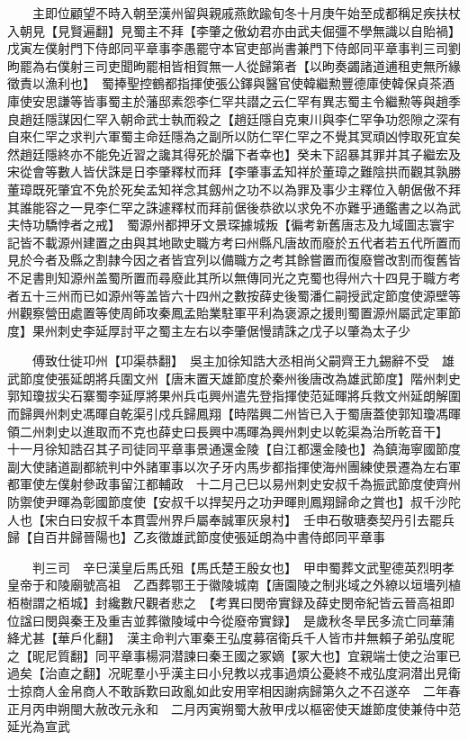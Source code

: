 　　主即位顧望不時入朝至漢州留與親戚燕飲踰旬冬十月庚午始至成都稱足疾扶杖入朝見【見賢遍翻】見蜀主不拜【李肇之傲幼君亦由武夫倔彊不學無識以自貽禍】　戊寅左僕射門下侍郎同平章事李愚罷守本官吏部尚書兼門下侍郎同平章事判三司劉昫罷為右僕射三司吏聞昫罷相皆相賀無一人從歸第者【以昫奏蠲諸道逋租吏無所緣徵責以漁利也】　蜀捧聖控鶴都指揮使張公鐸與醫官使韓繼勲豐德庫使韓保貞茶酒庫使安思謙等皆事蜀主於藩邸素怨李仁罕共譛之云仁罕有異志蜀主令繼勲等與趙季良趙廷隱謀因仁罕入朝命武士執而殺之【趙廷隱自克東川與李仁罕争功怨隙之深有自來仁罕之求判六軍蜀主命廷隱為之副所以防仁罕仁罕之不覺其冥頑凶悖取死宜矣然趙廷隱終亦不能免近習之讒其得死於牖下者幸也】癸未下詔暴其罪并其子繼宏及宋從會等數人皆伏誅是日李肇釋杖而拜【李肇事孟知祥於董璋之難陰拱而觀其孰勝董璋既死肇宜不免於死矣孟知祥念其劔州之功不以為罪及事少主釋位入朝倨傲不拜其誰能容之一見李仁罕之誅遽釋杖而拜前倨後恭欲以求免不亦難乎通鑑書之以為武夫恃功驕悖者之戒】　蜀源州都押牙文景琛據城叛【徧考新舊唐志及九域圖志寰宇記皆不載源州建置之由與其地歐史職方考曰州縣凡唐故而廢於五代者若五代所置而見於今者及縣之割隷今因之者皆宜列以備職方之考其餘嘗置而復廢嘗改割而復舊皆不足書則知源州盖蜀所置而尋廢此其所以無傳同光之克蜀也得州六十四見于職方考者五十三州而已如源州等盖皆六十四州之數按薛史後蜀潘仁嗣授武定節度使源壁等州觀察營田處置等使周師攻秦鳳孟貽業駐軍平利為褒源之援則蜀置源州屬武定軍節度】果州刺史李延厚討平之蜀主左右以李肇倨慢請誅之戊子以肇為太子少

　　傅致仕徙卭州【卭渠恭翻】　吳主加徐知誥大丞相尚父嗣齊王九錫辭不受　雄武節度使張延朗將兵圍文州【唐末置天雄節度於秦州後唐改為雄武節度】階州刺史郭知瓊拔尖石寨蜀李延厚將果州兵屯興州遣先登指揮使范延暉將兵救文州延朗解圍而歸興州刺史馮暉自乾渠引戍兵歸鳳翔【時階興二州皆已入于蜀唐蓋使郭知瓊馮暉領二州刺史以進取而不克也薛史曰長興中馮暉為興州刺史以乾渠為治所乾音干】　十一月徐知誥召其子司徒同平章事景通還金陵【自江都還金陵也】為鎮海寧國節度副大使諸道副都統判中外諸軍事以次子牙内馬步都指揮使海州團練使景遷為左右軍都軍使左僕射參政事留江都輔政　十二月己巳以易州刺史安叔千為振武節度使齊州防禦使尹暉為彰國節度使【安叔千以捍契丹之功尹暉則鳳翔歸命之賞也】叔千沙陀人也【宋白曰安叔千本貫雲州界戶屬奉誠軍灰泉村】　壬申石敬瑭奏契丹引去罷兵歸【自百井歸晉陽也】乙亥徵雄武節度使張延朗為中書侍郎同平章事

　　判三司　辛巳漢皇后馬氏殂【馬氏楚王殷女也】　甲申蜀葬文武聖德英烈明孝皇帝于和陵廟號高祖　乙酉葬鄂王于徽陵城南【唐園陵之制兆域之外繚以垣墻列植栢樹謂之栢城】封纔數尺觀者悲之　【考異曰閔帝實録及薛史閔帝紀皆云晉高祖即位諡曰閔與秦王及重吉並葬徽陵域中今從廢帝實録】　是歲秋冬旱民多流亡同華蒲絳尤甚【華戶化翻】　漢主命判六軍秦王弘度募宿衛兵千人皆市井無賴子弟弘度昵之【昵尼質翻】同平章事楊洞潜諫曰秦王國之冢嫡【冢大也】宜親端士使之治軍已過矣【治直之翻】况昵羣小乎漢主曰小兒教以戎事過煩公憂終不戒弘度洞潜出見衛士掠商人金帛商人不敢訴歎曰政亂如此安用宰相因謝病歸第久之不召遂卒　二年春正月丙申朔閩大赦改元永和　二月丙寅朔蜀大赦甲戌以樞密使天雄節度使兼侍中范延光為宣武

